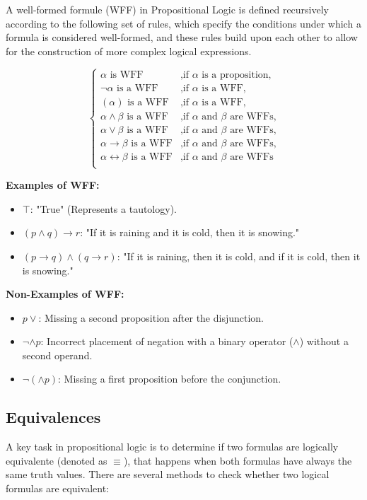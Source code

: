 A well-formed formule (WFF) in Propositional Logic is defined recursively according to the following set of rules, which specify the conditions under which a formula is considered well-formed, and these rules build upon each other to allow for the construction of more complex logical expressions.

\[
\left\{
\begin{array}{ll}
\alpha \text{ is WFF} & \text{,if } \alpha \text{ is a proposition,}\\
\neg \alpha \text{ is a WFF} & \text{,if } \alpha \text{ is a WFF,}\\
(\alpha) \text{ is a WFF} & \text{,if } \alpha \text{ is a WFF,}\\
\alpha \land \beta \text{ is a WFF} & \text{,if } \alpha \text{ and } \beta \text{ are WFFs,}\\
\alpha \lor \beta \text{ is a WFF} & \text{,if } \alpha \text{ and } \beta \text{ are WFFs,} \\
\alpha \rightarrow \beta \text{ is a WFF} & \text{,if } \alpha \text{ and } \beta \text{ are WFFs,} \\
\alpha \leftrightarrow \beta \text{ is a WFF} & \text{,if } \alpha \text{ and } \beta \text{ are WFFs} \\
\end{array}
\right.
\]

\textbf{Examples of WFF:}
\begin{itemize}
    \item \(\top\): "True" (Represents a tautology).
    \item \((p \land q) \to r\): "If it is raining and it is cold, then it is snowing."
    \item \((p \to q) \land (q \to r)\): "If it is raining, then it is cold, and if it is cold, then it is snowing."
\end{itemize}

\textbf{Non-Examples of WFF:}
\begin{itemize}
    \item \(p \lor \): Missing a second proposition after the disjunction.
    \item \(\neg \land p\): Incorrect placement of negation with a binary operator (\(\land\)) without a second operand.
    \item \(\neg (\land p)\): Missing a first proposition before the conjunction.
\end{itemize}

\subsection{Equivalences}
A key task in propositional logic is to determine if two formulas are logically equivalente (denoted as \(\equiv\)), that happens when both formulas have always the same truth values. There are several methods to check whether two logical formulas are equivalent: 

